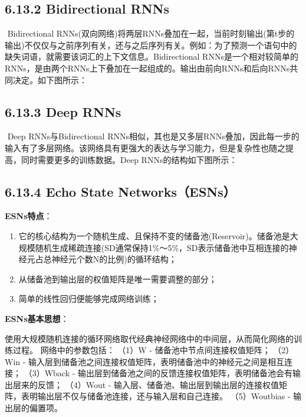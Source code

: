 \subsection{6.13.2 Bidirectional RNNs}\label{bidirectional-rnns}

​ Bidirectional
RNNs(双向网络)将两层RNNs叠加在一起，当前时刻输出(第t步的输出)不仅仅与之前序列有关，还与之后序列有关。例如：为了预测一个语句中的缺失词语，就需要该词汇的上下文信息。Bidirectional
RNNs是一个相对较简单的RNNs，是由两个RNNs上下叠加在一起组成的。输出由前向RNNs和后向RNNs共同决定。如下图所示：


\subsection{6.13.3 Deep RNNs}\label{deep-rnns}

​ Deep RNNs与Bidirectional
RNNs相似，其也是又多层RNNs叠加，因此每一步的输入有了多层网络。该网络具有更强大的表达与学习能力，但是复杂性也随之提高，同时需要更多的训练数据。Deep
RNNs的结构如下图所示： %

\subsection{6.13.4 Echo State
Networks（ESNs）}\label{echo-state-networksesns}

\textbf{ESNs特点}：

\begin{enumerate}
\def\labelenumi{\arabic{enumi}.}
\item
  它的核心结构为一个随机生成、且保持不变的储备池(Reservoir)。储备池是大规模随机生成稀疏连接(SD通常保持1\%～5\%，SD表示储备池中互相连接的神经元占总神经元个数N的比例)的循环结构；
\item
  从储备池到输出层的权值矩阵是唯一需要调整的部分；
\item
  简单的线性回归便能够完成网络训练；
\end{enumerate}

\textbf{ESNs基本思想}：

​
使用大规模随机连接的循环网络取代经典神经网络中的中间层，从而简化网络的训练过程。
网络中的参数包括： （1）W - 储备池中节点间连接权值矩阵； （2）Win -
输入层到储备池之间连接权值矩阵，表明储备池中的神经元之间是相互连接；
（3）Wback -
输出层到储备池之间的反馈连接权值矩阵，表明储备池会有输出层来的反馈；
（4）Wout -
输入层、储备池、输出层到输出层的连接权值矩阵，表明输出层不仅与储备池连接，还与输入层和自己连接。
（5）Woutbias - 输出层的偏置项。

